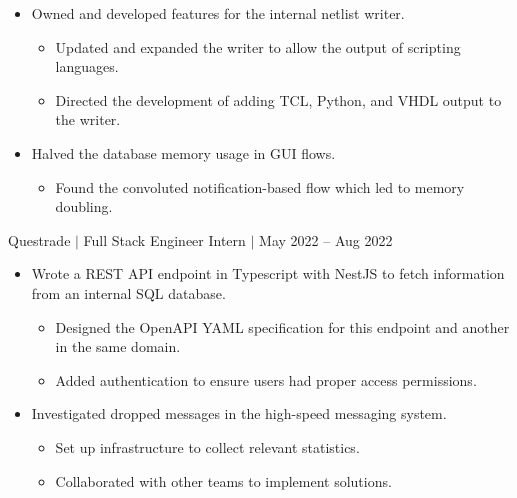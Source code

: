 \documentclass[12pt]{article}
\newcommand{\textDate}[3]{\noindent#1 $|$ #2 $|$ {\color{textGray} #3}}
\begin{document}
\begin{small}
\begin{itemize}
            \item {\color{textGray} Owned and developed features for the internal netlist writer.}
                \begin{itemize}[label=$\circ$,topsep=-5px,partopsep=0px]
                    \itemsep0em 
                    \item {\color{textGray} Updated and expanded the writer to allow the output of scripting languages.}
                    \item {\color{textGray} Directed the development of adding TCL, Python, and VHDL output to the writer.}
                \end{itemize}

            \item {\color{textGray} Halved the database memory usage in GUI flows.}
                \begin{itemize}[label=$\circ$,topsep=-5px,partopsep=0px]
                    \itemsep0em 
                    \item {\color{textGray} Found the convoluted notification-based flow which led to memory doubling.}
                \end{itemize}
        \end{itemize}
    \end{small}


    \textDate{Questrade}{Full Stack Engineer Intern}{May 2022 -- Aug 2022}
    \begin{small}
        \begin{itemize}
            \itemsep0em 
            \item {\color{textGray} Wrote a REST API endpoint in Typescript with NestJS to fetch information from an internal SQL database.}
                \begin{itemize}[label=$\circ$,topsep=-5px,partopsep=0px]
                    \itemsep0em 
                    \item {\color{textGray} Designed the OpenAPI YAML specification for this endpoint and another in the same domain.}
                    \item {\color{textGray} Added authentication to ensure users had proper access permissions.}
                \end{itemize}
            \item {\color{textGray} Investigated dropped messages in the high-speed messaging system.}
                \begin{itemize}[label=$\circ$,topsep=-5px,partopsep=0px]
                    \itemsep0em 
                    \item {\color{textGray} Set up infrastructure to collect relevant statistics.}
                    \item {\color{textGray} Collaborated with other teams to implement solutions.}
                \end{itemize}
        \end{itemize}
    \end{small}
\end{document}
